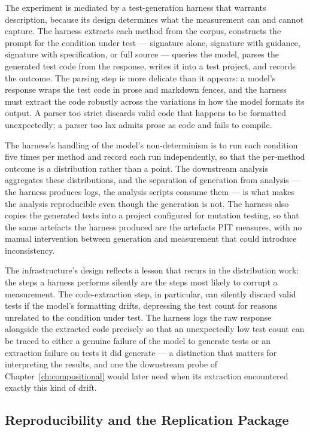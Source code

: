 The experiment is mediated by a test-generation harness that warrants description,
because its design determines what the measurement can and cannot capture. The
harness extracts each method from the corpus, constructs the prompt for the
condition under test --- signature alone, signature with guidance, signature with
specification, or full source --- queries the model, parses the generated test
code from the response, writes it into a test project, and records the outcome. The
parsing step is more delicate than it appears: a model's response wraps the test
code in prose and markdown fences, and the harness must extract the code robustly
across the variations in how the model formats its output. A parser too strict
discards valid code that happens to be formatted unexpectedly; a parser too lax
admits prose as code and fails to compile.

The harness's handling of the model's non-determinism is to run each condition five
times per method and record each run independently, so that the per-method outcome
is a distribution rather than a point. The downstream analysis aggregates these
distributions, and the separation of generation from analysis --- the harness
produces logs, the analysis scripts consume them --- is what makes the analysis
reproducible even though the generation is not. The harness also copies the
generated tests into a project configured for mutation testing, so that the same
artefacts the harness produced are the artefacts PIT measures, with no manual
intervention between generation and measurement that could introduce inconsistency.

The infrastructure's design reflects a lesson that recurs in the distribution work:
the steps a harness performs silently are the steps most likely to corrupt a
measurement. The code-extraction step, in particular, can silently discard valid
tests if the model's formatting drifts, depressing the test count for reasons
unrelated to the condition under test. The harness logs the raw response alongside
the extracted code precisely so that an unexpectedly low test count can be traced to
either a genuine failure of the model to generate tests or an extraction failure on
tests it did generate --- a distinction that matters for interpreting the results,
and one the downstream probe of Chapter~\ref{ch:compositional} would later need
when its extraction encountered exactly this kind of drift.

\subsection{Reproducibility and the Replication Package}

